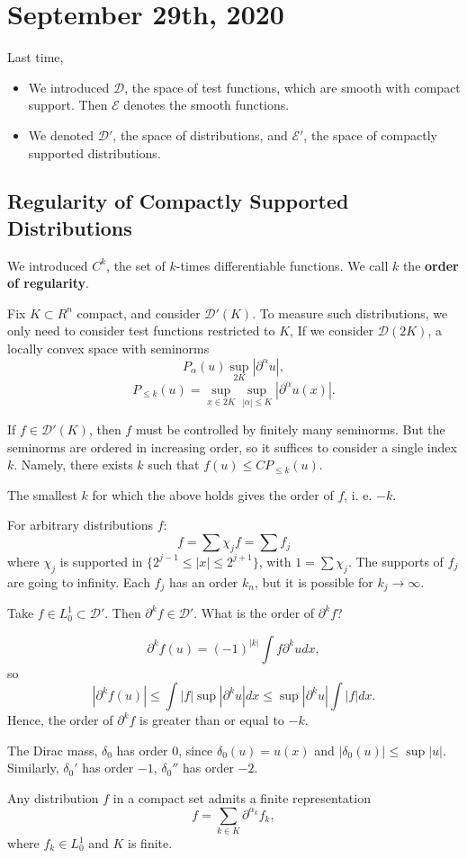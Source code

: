 \documentclass[12pt]{scrartcl}
\begin{document}
\section{September 29th, 2020}
Last time,
\begin{itemize}
\item We introduced $\mathcal{D}$, the space of test functions, which are smooth with compact support.  Then $\mathcal{E}$ denotes the smooth functions.
\item We denoted $\mathcal{D}'$, the space of distributions, and $\mathcal{E}'$, the space of compactly supported distributions.
\end{itemize}
\subsection{Regularity of Compactly Supported Distributions}
We introduced $C^k$, the set of $k$-times differentiable functions.  We call $k$ the \textbf{order of regularity}.

Fix $K \subset R^n$ compact, and consider $\mathcal D'(K)$.  To measure such distributions, we only need to consider test functions restricted to $K$,  If we consider $\mathcal{D}(2K)$, a locally convex space with seminorms $$P_\alpha(u) \sup_{2K}|\partial^\alpha u|,$$
$$P_{\le k}(u) = \sup_{x \in 2K} \sup_{|\alpha| \le K} |\partial^\alpha u(x)|.$$

If $f \in \mathcal D'(K)$, then $f$ must be controlled by finitely many seminorms.  But the seminorms are ordered in increasing order, so it suffices to consider a single index $k$.  Namely, there exists $k$ such that $f(u) \le C P_{\le k}(u).$
\begin{definition} The smallest $k$ for which the above holds gives the order of $f$, i. e. $-k$.
\end{definition}

For arbitrary distributions $f$:
$$f = \sum \chi_{j} f = \sum f_j$$
where $\chi_j$ is supported in $\{2^{j-1} \le |x| \le 2^{j+1}\}$, with $1 = \sum \chi_j$.  The supports of $f_j$ are going to infinity.  Each $f_j$ has an order $k_n$, but it is possible for $k_j \rightarrow \infty$.

\begin{example} Take $f \in L_{0}^1 \subset \mathcal D'$.  Then $\partial^k f \in \mathcal D'$.  What is the order of $\partial^k f$?

$$\partial^k f(u) = (-1)^{|k|} \int f \partial^k u dx,$$
so $$|\partial^k f(u)| \le \int |f| \sup |\partial^k u|dx \le \sup|\partial^k u| \int |f|dx.$$
Hence, the order of $\partial^k f$ is greater than or equal to $-k$.
\end{example}
\begin{example} The Dirac mass, $\delta_0$ has order $0$, since $\delta_0(u) = u(x)$ and $|\delta_0(u)| \le \sup |u|$.  Similarly, $\delta_0'$ has order $-1$, $\delta_0''$ has order $-2$.
\end{example}
\begin{thm} Any distribution $f$ in a compact set admits a finite representation
$$f = \sum_{k \in K}\partial^{\alpha_k}f_k,$$
where $f_k \in L_0^1$ and $K$ is finite.
\end{thm}
\end{document}
